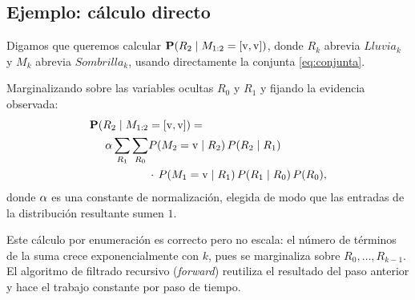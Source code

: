 \subsection{Ejemplo: c\'alculo directo}
\label{subsec:ejemplo_calculo}

\begin{ejemplo}
  \label{ej:sombrilla_filtrado}
  Digamos que queremos calcular
  $\mathbf{P}(R_2\mid M_{1:2}=[\mathrm{v},\mathrm{v}])$, donde $R_k$ abrevia
  $\mathit{Lluvia}_k$ y $M_k$ abrevia $\mathit{Sombrilla}_k$, usando
  directamente la conjunta \eqref{eq:conjunta}.

  Marginalizando sobre las variables ocultas $R_0$ y $R_1$ y fijando la
  evidencia observada:
  \begin{align}
    \label{eq:sombrilla_enumeracion}
    \mathbf{P}(R_2\mid M_{1:2}&=[\mathrm{v},\mathrm{v}]) = \nonumber\\
    \alpha \sum_{R_1}\sum_{R_0}
      &P(M_2=\mathrm{v}\mid R_2)\,P(R_2\mid R_1)\nonumber\\
      &\cdot\, P(M_1=\mathrm{v}\mid R_1)\,P(R_1\mid R_0)\,P(R_0),
  \end{align}
  donde $\alpha$ es una constante de normalizaci\'on, elegida de modo que las
  entradas de la distribuci\'on resultante sumen $1$.
\end{ejemplo}

\begin{observacion}
  Este c\'alculo por enumeraci\'on es correcto pero no escala: el n\'umero de
  t\'erminos de la suma crece exponencialmente con $k$, pues se marginaliza
  sobre $R_0,\dots,R_{k-1}$. El algoritmo de filtrado recursivo
  (\emph{forward}) reutiliza el resultado del paso anterior y hace el trabajo
  constante por paso de tiempo.
\end{observacion}
